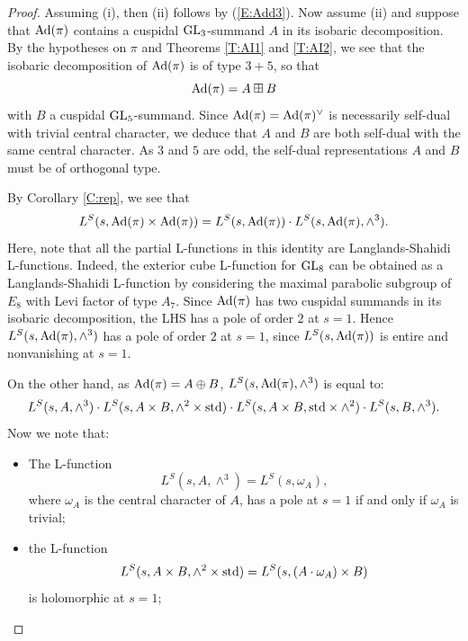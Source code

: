 \documentclass[11pt]{amsart}
\theoremstyle{plain}
\numberwithin{equation}{section}
\def\GL{{\rm GL}}
\begin{document}
\begin{proof}
Assuming (i), then (ii) follows by (\ref{E:Add3}). 
Now assume (ii) and suppose that ${\rm Ad}(\pi)$ contains a cuspidal $\GL_3$-summand $A$ in its isobaric decomposition. By the hypotheses on $\pi$ and Theorems \ref{T:AI1} and \ref{T:AI2},  we see that the isobaric decomposition of ${\rm Ad}(\pi)$ is of type $3+5$, so that 
\[ {\rm Ad}(\pi) = A  \boxplus B \]
with $B$ a cuspidal $\GL_5$-summand.
Since ${\rm Ad}(\pi) = {\rm Ad}(\pi)^{\vee}$ is necessarily self-dual with trivial central character, we deduce that $A$ and $B$ are both self-dual with the same central character. 
As $3$ and $5$ are odd, the self-dual representations $A$ and $B$ must be of orthogonal type.
\vskip 5pt

By Corollary \ref{C:rep}, we see that
\begin{equation} \label{E:exteriorcube}
  L^S(s, {\rm Ad}(\pi)  \times {\rm Ad} (\pi)) = L^S(s, {\rm Ad}(\pi)) \cdot L^S(s, {\rm Ad}(\pi), \wedge^3). \end{equation}
  Here,  note that all the partial L-functions  in this identity are  Langlands-Shahidi L-functions. Indeed, the exterior cube L-function for $\GL_8$ can be obtained as a Langlands-Shahidi L-function by considering the maximal parabolic subgroup 
  of $E_8$ with Levi factor of type $A_7$.  Since ${\rm Ad}(\pi)$ has two  cuspidal summands in its isobaric decomposition, the LHS has a pole of order $2$ at $s=1$. Hence 
$L^S(s, {\rm Ad}(\pi), \wedge^3)$ has a pole of order $2$ at $s=1$, since $L^S(s, {\rm Ad}(\pi))$ is entire and nonvanishing at $s=1$.
\vskip 5pt

On the other hand, as ${\rm Ad}(\pi) = A \oplus B$, $L^S(s, {\rm Ad}(\pi), \wedge^3)$ is equal to:
\begin{equation} \label{E:wedge3} 
 L^S(s, A, \wedge^3) \cdot L^S(s, A \times B, \wedge^2 \times {\rm std}) \cdot L^S(s, A \times B, {\rm std} \times \wedge^2) \cdot L^S(s, B, \wedge^3). \end{equation}
Now we note that:
\begin{itemize}
\item The L-function
\[  L^S(s, A, \wedge^3) = L^S(s, \omega_{A}), \]
where $\omega_{A}$ is the central character of $A$, has a pole at $s=1$ if and only if $\omega_{A}$ is trivial;

\item the L-function
\[  L^S(s, A \times B, \wedge^2 \times {\rm std}) = L^S(s, (A \cdot \omega_{A}) \times B) \]
is holomorphic  at $s=1$;


\end{itemize}
\end{proof}
\end{document}
